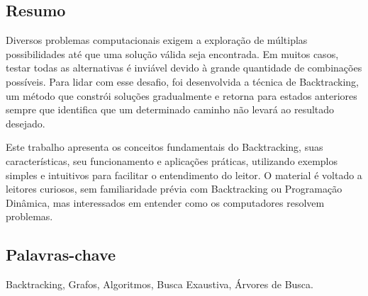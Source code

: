 
\subsection*{Resumo}

Diversos problemas computacionais exigem a exploração de múltiplas possibilidades até que uma solução válida seja encontrada. Em muitos casos, testar todas as alternativas é inviável devido à grande quantidade de combinações possíveis. Para lidar com esse desafio, foi desenvolvida a técnica de Backtracking, um método que constrói soluções gradualmente e retorna para estados anteriores sempre que identifica que um determinado caminho não levará ao resultado desejado.

Este trabalho apresenta os conceitos fundamentais do Backtracking, suas características, seu funcionamento e aplicações práticas, utilizando exemplos simples e intuitivos para facilitar o entendimento do leitor. O material é voltado a leitores curiosos, sem familiaridade prévia com Backtracking ou Programação Dinâmica, mas interessados em entender como os computadores resolvem problemas.

\subsection*{Palavras-chave}

Backtracking, Grafos, Algoritmos, Busca Exaustiva, Árvores de Busca.
